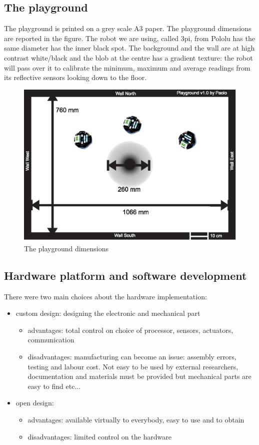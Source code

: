 \subsection{The playground}
The playground is printed on a grey scale A3 paper. The playground dimensions
are reported in the figure. The robot we are using, called 3pi, from Pololu has the
 same diameter has the inner black spot.
The background and the wall are at high contrast white/black and the blob at the
centre has a gradient texture: the robot will pass over it to calibrate the minimum,
maximum and average readings from its reflective sensors looking down to the floor.
\begin{figure}[htbp]
\begin{center}
\includegraphics[scale=0.8]{figures/playground/playgrounddesc.eps}
\caption[Playground setup]{The playground dimensions}
\end{center}
\end{figure}
\subsection{Hardware platform and software development}
There were two main choices about the hardware implementation:
\begin{itemize}
 \item custom design: designing the electronic and mechanical part
\begin{itemize}
\item advantages: total control on choice of processor, sensors, actuators, communication
\item disadvantages: manufacturing can become an issue: assembly errors, testing and labour cost. Not easy to be used by external researchers, documentation and materials must be provided but mechanical parts are easy to find etc...
\end{itemize}
 \item open design:
\begin{itemize}
\item advantages: available virtually to everybody, easy to use and to obtain
\item disadvantages: limited control on the hardware
\end{itemize}
\end{itemize}

